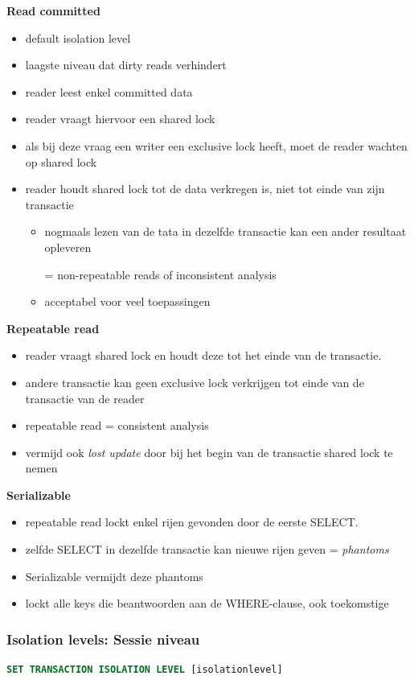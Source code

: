 \documentclass[a4paper,12pt]{article}
\begin{document}
\textbf{Read committed}
\begin{itemize}
\item default isolation level
\item laagste niveau dat dirty reads verhindert
\item reader leest enkel committed data
\item reader vraagt hiervoor een shared lock
\item als bij deze vraag een writer een exclusive lock heeft, moet de reader wachten op shared lock
\item reader houdt shared lock tot de data verkregen is, niet tot einde van zijn transactie
	\begin{itemize}
	\item nogmaals lezen van de tata in dezelfde transactie kan een ander resultaat opleveren
	
	= non-repeatable reads of inconsistent analysis
	\item acceptabel voor veel toepassingen
	\end{itemize}
\end{itemize}

\textbf{Repeatable read}
\begin{itemize}
\item reader vraagt shared lock en houdt deze tot het einde van de transactie.
\item andere transactie kan geen exclusive lock verkrijgen tot einde van de transactie van de reader
\item repeatable read = consistent analysis
\item vermijd ook \textit{lost update} door bij het begin van de transactie shared lock te nemen
\end{itemize}

\textbf{Serializable}
\begin{itemize}
\item repeatable read lockt enkel rijen gevonden door de eerste SELECT.
\item zelfde SELECT in dezelfde transactie kan nieuwe rijen geven = \textit{phantoms}
\item Serializable vermijdt deze phantoms
\item lockt alle keys die beantwoorden aan de WHERE-clause, ook toekomstige
\end{itemize}

\subsubsection{Isolation levels: Sessie niveau}
\begin{lstlisting}[language=sql, breaklines=true]
SET TRANSACTION ISOLATION LEVEL [isolationlevel]
\end{lstlisting}
\end{document}
